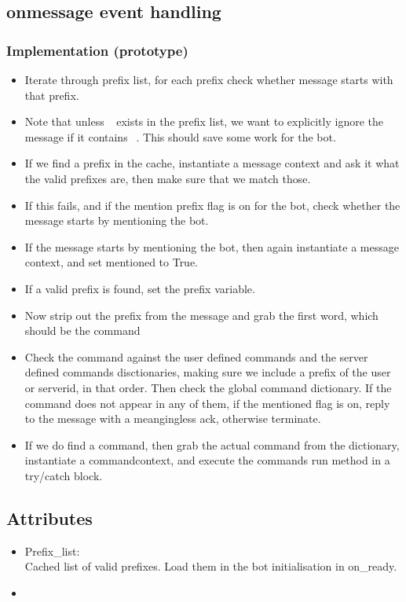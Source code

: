 \documentclass[a4paper]{amsart}
\begin{document}
\subsection{onmessage event handling}
    \subsubsection{Implementation (prototype)}
        \begin{itemize}
            \item Iterate through prefix list, for each prefix check whether message starts with that prefix.
            \item Note that unless $~~$ exists in the prefix list, we want to explicitly ignore the message if it contains $~~$. This should save some work for the bot.
            \item If we find a prefix in the cache, instantiate a message context and ask it what the valid prefixes are, then make sure that we match those.
            \item If this fails, and if the mention prefix flag is on for the bot, check whether the message starts by mentioning the bot.
            \item If the message starts by mentioning the bot, then again instantiate a message context, and set mentioned to True.
            \item If a valid prefix is found, set the prefix variable.
            \item Now strip out the prefix from the message and grab the first word, which should be the command
            \item Check the command against the user defined commands and the server defined commands disctionaries, making sure we include a prefix of the user or serverid, in that order. Then check the global command dictionary. If the command does not appear in any of them, if the mentioned flag is on, reply to the message with a meangingless ack, otherwise terminate.
            \item If we do find a command, then grab the actual command from the dictionary, instantiate a commandcontext, and execute the commands run method in a try/catch block.
        \end{itemize}
\subsection{Attributes}
    \begin{itemize}
        \item Prefix\_list:\\
            Cached list of valid prefixes. Load them in the bot initialisation in on\_ready.
        \item 
    \end{itemize}
\end{document}
